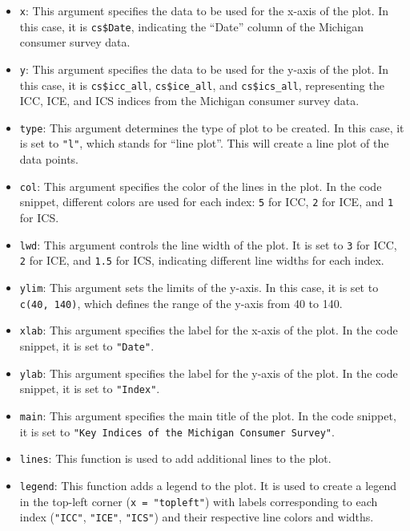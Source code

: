 \documentclass[
]{book}
\providecommand{\tightlist}{%
  \setlength{\itemsep}{0pt}\setlength{\parskip}{0pt}}
\begin{document}
\begin{itemize}
\tightlist
\item
  \texttt{x}: This argument specifies the data to be used for the x-axis of the plot. In this case, it is \texttt{cs\$Date}, indicating the ``Date'' column of the Michigan consumer survey data.
\item
  \texttt{y}: This argument specifies the data to be used for the y-axis of the plot. In this case, it is \texttt{cs\$icc\_all}, \texttt{cs\$ice\_all}, and \texttt{cs\$ics\_all}, representing the ICC, ICE, and ICS indices from the Michigan consumer survey data.
\item
  \texttt{type}: This argument determines the type of plot to be created. In this case, it is set to \texttt{"l"}, which stands for ``line plot''. This will create a line plot of the data points.
\item
  \texttt{col}: This argument specifies the color of the lines in the plot. In the code snippet, different colors are used for each index: \texttt{5} for ICC, \texttt{2} for ICE, and \texttt{1} for ICS.
\item
  \texttt{lwd}: This argument controls the line width of the plot. It is set to \texttt{3} for ICC, \texttt{2} for ICE, and \texttt{1.5} for ICS, indicating different line widths for each index.
\item
  \texttt{ylim}: This argument sets the limits of the y-axis. In this case, it is set to \texttt{c(40,\ 140)}, which defines the range of the y-axis from 40 to 140.
\item
  \texttt{xlab}: This argument specifies the label for the x-axis of the plot. In the code snippet, it is set to \texttt{"Date"}.
\item
  \texttt{ylab}: This argument specifies the label for the y-axis of the plot. In the code snippet, it is set to \texttt{"Index"}.
\item
  \texttt{main}: This argument specifies the main title of the plot. In the code snippet, it is set to \texttt{"Key\ Indices\ of\ the\ Michigan\ Consumer\ Survey"}.
\item
  \texttt{lines}: This function is used to add additional lines to the plot.
\item
  \texttt{legend}: This function adds a legend to the plot. It is used to create a legend in the top-left corner (\texttt{x\ =\ "topleft"}) with labels corresponding to each index (\texttt{"ICC"}, \texttt{"ICE"}, \texttt{"ICS"}) and their respective line colors and widths.
\end{itemize}
\end{document}
